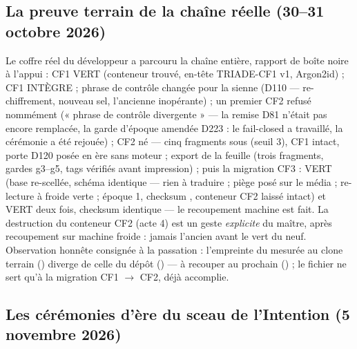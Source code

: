 \subsection{La preuve terrain de la chaîne réelle (30--31 octobre 2026)}\label{sec:preuveterrain}

Le coffre réel du développeur a parcouru la chaîne entière, rapport de boîte noire à
l'appui : CF1  VERT (conteneur trouvé, en-tête TRIADE-CF1 v1, Argon2id) ;
CF1  INTÈGRE ; phrase de contrôle changée pour la sienne (D110 —
re-chiffrement, nouveau sel, l'ancienne inopérante) ; un premier  CF2
refusé nommément (« phrase de contrôle divergente » — la remise D81 n'était pas encore
remplacée, la garde d'époque amendée D223 : le fail-closed a travaillé, la cérémonie a été rejouée) ; CF2 né — cinq
fragments sous  (seuil 3), CF1 intact, porte D120 posée en ère
sans moteur ; export de la feuille (trois fragments, gardes g3--g5, tags vérifiés avant
impression) ; puis la migration CF3 :  VERT (base re-scellée, schéma
identique — rien à traduire ; piège posé sur le média ; re-lecture à froide verte ;
époque 1, checksum , conteneur CF2 laissé intact) et  VERT
deux fois, checksum identique — le recoupement machine est fait. La destruction du
conteneur CF2 (acte 4) est un geste \emph{explicite} du maître, après recoupement sur
machine froide : jamais l'ancien avant le vert du neuf. Observation honnête consignée à
la passation : l'empreinte du  mesurée au clone terrain
() diverge de celle du dépôt () — à recouper au
prochain  () ; le fichier ne sert qu'à la migration
CF1 $\to$ CF2, déjà accomplie.

\subsection{Les cérémonies d'ère du sceau de l'Intention (5 novembre 2026)}\label{sec:ceremoniesere}

